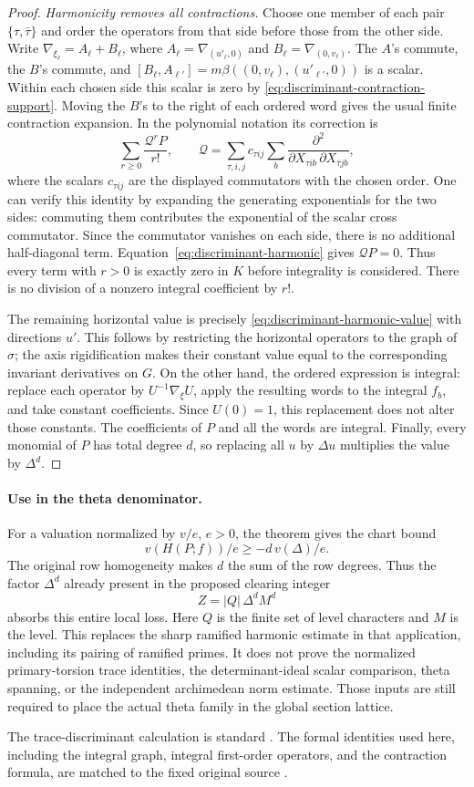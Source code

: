 \begin{proof}
\emph{Harmonicity removes all contractions.}
Choose one member of each pair $\{\tau,\bar\tau\}$ and order the operators
from that side before those from the other side.  Write
$\nabla_{\xi_\ell}=A_\ell+B_\ell$, where
$A_\ell=\nabla_{(u'_\ell,0)}$ and
$B_\ell=\nabla_{(0,v_\ell)}$.
The $A$'s commute, the $B$'s commute, and
$[B_\ell,A_{\ell'}]=m\beta((0,v_\ell),(u'_{\ell'},0))$ is a scalar.
Within each chosen side this scalar is zero by
\eqref{eq:discriminant-contraction-support}.
Moving the $B$'s to the right of each ordered word gives the usual finite
contraction expansion.  In the polynomial notation its correction is
\[
         \sum_{r\geq0}\frac{\mathcal Q^rP}{r!},\qquad
 \mathcal Q=\sum_{\tau,i,j}c_{\tau i j}
       \sum_b\frac{\partial^2}
        {\partial X_{\tau i b}\,\partial X_{\bar\tau j b}},
\]
where the scalars $c_{\tau i j}$ are the displayed commutators with the
chosen order.  One can verify this identity by expanding the generating
exponentials for the two sides: commuting them contributes the exponential
of the scalar cross commutator.  Since the commutator vanishes on each
side, there is no additional half-diagonal term.
Equation~\eqref{eq:discriminant-harmonic} gives $\mathcal QP=0$.
Thus every term with $r>0$ is exactly zero in $K$ before integrality is
considered.  There is no division of a nonzero integral coefficient by $r!$.

The remaining horizontal value is precisely
\eqref{eq:discriminant-harmonic-value} with directions $u'$.  This follows
by restricting the horizontal operators to the graph of $\sigma$; the
axis rigidification makes their constant value equal to the corresponding
invariant derivatives on $G$.
On the other hand, the ordered expression is integral: replace each
operator by $U^{-1}\nabla_\xi U$, apply the resulting words to the integral
$f_b$, and take constant coefficients.  Since $U(0)=1$, this replacement
does not alter those constants.  The coefficients of $P$ and all the
words are integral.  Finally, every monomial of $P$ has total degree $d$,
so replacing all $u$ by $\Delta u$ multiplies the value by $\Delta^d$.
\end{proof}

\paragraph{Use in the theta denominator.}
For a valuation normalized by $v/e$, $e>0$, the theorem gives the chart
bound
\[
                        v(H(P;f))/e\geq-d\,v(\Delta)/e.
\]
The original row homogeneity makes $d$ the sum of the row degrees.  Thus
the factor $\Delta^d$ already present in the proposed clearing integer
\[
                        Z=|Q|\,\Delta^d M^d
\]
absorbs this entire local loss.  Here $Q$ is the finite set of level
characters and $M$ is the level.  This replaces the sharp ramified
harmonic estimate in that application, including its pairing of ramified
primes.  It does not prove the normalized primary-torsion trace identities,
the determinant-ideal scalar comparison, theta spanning, or the independent
archimedean norm estimate.  Those inputs are still required to place the
actual theta family in the global section lattice.

The trace-discriminant calculation is standard
\cite{stacks-harmonic-discriminant}.  The formal identities used here,
including the integral graph, integral first-order operators, and the
contraction formula, are matched to the fixed original source
\cite{alpoge-harmonic-discriminant}.
